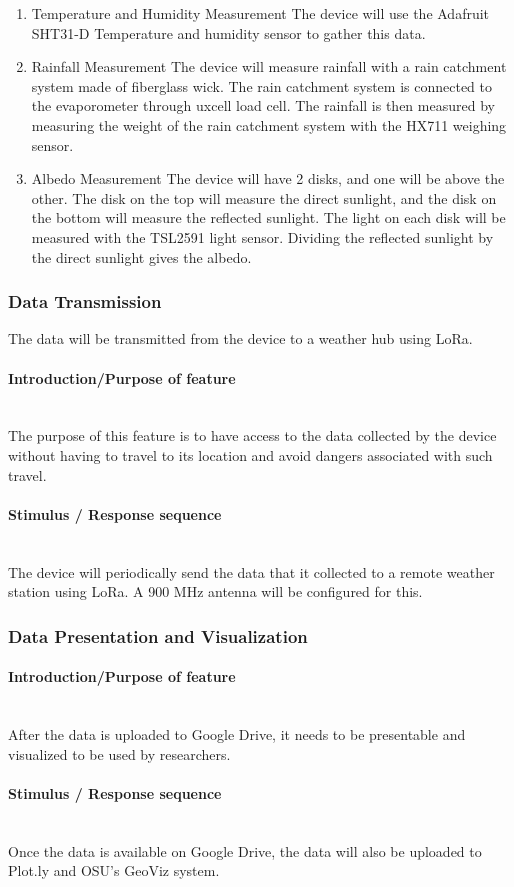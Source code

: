 \documentclass[onecolumn, draftclsnofoot,10pt, compsoc]{IEEEtran}
\newcommand{\indentitem}{\setlength\itemindent{35pt}}
\newcommand{\subsubsubsection}[1]{\paragraph{#1}\mbox{}\\}
\begin{document}
\begin{enumerate}
\indentitem\item Temperature and Humidity Measurement
\newline
The device will use the Adafruit SHT31-D Temperature and humidity sensor to gather this data.
\indentitem\item Rainfall Measurement
\newline
The device will measure rainfall with a rain catchment system made of fiberglass wick. The rain catchment system is connected to the evaporometer through uxcell load cell. The rainfall is then measured by measuring the weight of the rain catchment system with the HX711 weighing sensor.
\indentitem\item Albedo Measurement
\newline
The device will have 2 disks, and one will be above the other. The disk on the top will measure the direct sunlight, and the disk on the bottom will measure the reflected sunlight. The light on each disk will be measured with the TSL2591 light sensor. Dividing the reflected sunlight by the direct sunlight gives the albedo.
\end{enumerate}
\subsubsection{Data Transmission}
The data will be transmitted from the device to a weather hub using LoRa.
\subsubsubsection{Introduction/Purpose of feature}
The purpose of this feature is to have access to the data collected by the device without having to travel to its location and avoid dangers associated with such travel.
\subsubsubsection{Stimulus / Response sequence}
The device will periodically send the data that it collected to a remote weather station using LoRa. A 900 MHz antenna will be configured for this.
\subsubsection{Data Presentation and Visualization}
\subsubsubsection{Introduction/Purpose of feature}
After the data is uploaded to Google Drive, it needs to be presentable and visualized to be used by researchers.
\subsubsubsection{Stimulus / Response sequence}
Once the data is available on Google Drive, the data will also be uploaded to Plot.ly and OSU’s GeoViz system.
\end{document}
